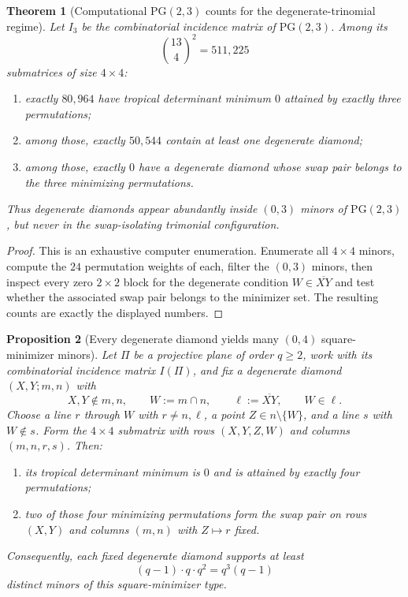 \documentclass[11pt]{amsart}
\numberwithin{equation}{section}
\theoremstyle{plain}
\newtheorem{theorem}{Theorem}[section]
\newtheorem{proposition}[theorem]{Proposition}
\theoremstyle{definition}
\theoremstyle{remark}
\begin{document}
\begin{theorem}[Computational $\mathrm{PG}(2,3)$ counts for the degenerate-trinomial regime]
\label{thm:pg23-degenerate-counts}
Let $I_3$ be the combinatorial incidence matrix of $\mathrm{PG}(2,3)$. Among its
\[
\binom{13}{4}^2=511{,}225
\]
submatrices of size $4\times4$:
\begin{enumerate}[leftmargin=2em]
  \item exactly $80{,}964$ have tropical determinant minimum $0$ attained by exactly three permutations;
  \item among those, exactly $50{,}544$ contain at least one degenerate diamond;
  \item among those, exactly $0$ have a degenerate diamond whose swap pair belongs to the three minimizing permutations.
\end{enumerate}
Thus degenerate diamonds appear abundantly inside $(0,3)$ minors of $\mathrm{PG}(2,3)$, but never in the swap-isolating trimonial configuration.
\end{theorem}

\begin{proof}
This is an exhaustive computer enumeration. Enumerate all $4\times4$ minors, compute the $24$ permutation weights of each,
filter the $(0,3)$ minors, then inspect every zero $2\times2$ block for the degenerate condition $W\in\overline{XY}$ and test whether the
associated swap pair belongs to the minimizer set. The resulting counts are exactly the displayed numbers.
\end{proof}

\begin{proposition}[Every degenerate diamond yields many $(0,4)$ square-minimizer minors]
\label{prop:degenerate-square-family}
Let $\Pi$ be a projective plane of order $q\ge 2$, work with its combinatorial incidence matrix $I(\Pi)$, and fix a degenerate diamond
$(X,Y;m,n)$ with
\[
X,Y\notin m,n,
\qquad
W:=m\cap n,\qquad \ell:=\overline{XY},\qquad W\in \ell.
\]
Choose a line $r$ through $W$ with $r\neq n,\ell$, a point $Z\in n\setminus\{W\}$, and a line $s$ with $W\notin s$. Form the $4\times4$
submatrix with rows $(X,Y,Z,W)$ and columns $(m,n,r,s)$. Then:
\begin{enumerate}[leftmargin=2em]
  \item its tropical determinant minimum is $0$ and is attained by exactly four permutations;
  \item two of those four minimizing permutations form the swap pair on rows $(X,Y)$ and columns $(m,n)$ with $Z\mapsto r$ fixed.
\end{enumerate}
Consequently, each fixed degenerate diamond supports at least
\[
(q-1)\cdot q\cdot q^2=q^3(q-1)
\]
distinct minors of this square-minimizer type.
\end{proposition}
\end{document}
